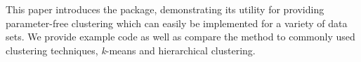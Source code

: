 This paper introduces the  package, demonstrating its
utility for providing parameter-free clustering which can easily be
implemented for a variety of data sets. We provide example code as well
as compare the method to commonly used clustering techniques,
\emph{k}-means and hierarchical clustering.




\address{%
Lucy D'Agostino McGowan\\
Wake Forest University\\%
Winston-Salem, NC\\ 27106\\
%
%
%
\href{mailto:mcgowald@wfu.edu}{\nolinkurl{mcgowald@wfu.edu}}%
}

\address{%
Katherine Moore\\
Wake Forest Unversity\\%
Winston-Salem, NC\\ 27106\\
%
%
%
\href{mailto:mooreke@wfu.edu}{\nolinkurl{mooreke@wfu.edu}}%
}

\address{%
Kenneth Berenhaut\\
Wake Forest University\\%
Winston-Salem, NC\\ 27106\\
%
%
%
\href{mailto:berenhks@wfu.edu}{\nolinkurl{berenhks@wfu.edu}}%
}
